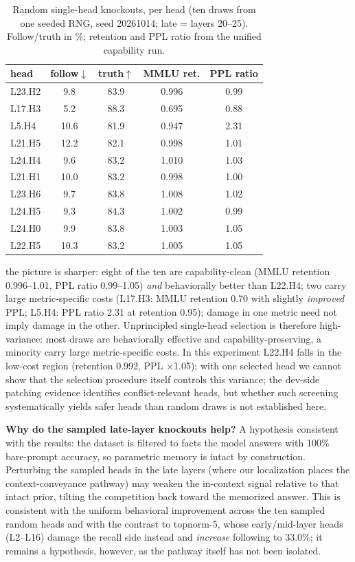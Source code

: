\documentclass[paper]{ieice}
\newcommand{\spec}{L22.H4}
\begin{document}
\begin{table}[t]
\caption{Random single-head knockouts, per head (ten draws from one
seeded RNG, seed 20261014; late = layers 20--25). Follow/truth in \%;
retention and PPL ratio from the unified capability run.}
\label{tab:rand1}
\begin{center}
\begin{tabular}{lcccc}
\toprule
head & follow$\downarrow$ & truth$\uparrow$ & MMLU ret. & PPL ratio \\
\midrule
L23.H2 & 9.8 & 83.9 & 0.996 & 0.99 \\
L17.H3 & 5.2 & 88.3 & 0.695 & 0.88 \\
L5.H4 & 10.6 & 81.9 & 0.947 & 2.31 \\
L21.H5 & 12.2 & 82.1 & 0.998 & 1.01 \\
L24.H4 & 9.6 & 83.2 & 1.010 & 1.03 \\
\midrule
L21.H1 & 10.0 & 83.2 & 0.998 & 1.00 \\
L23.H6 & 9.7 & 83.8 & 1.008 & 1.02 \\
L24.H5 & 9.3 & 84.3 & 1.002 & 0.99 \\
L24.H0 & 9.9 & 83.8 & 1.003 & 1.05 \\
L22.H5 & 10.3 & 83.2 & 1.005 & 1.05 \\
\bottomrule
\end{tabular}
\end{center}
\end{table}


the picture is sharper: eight of the ten are
capability-clean (MMLU retention 0.996--1.01, PPL ratio
0.99--1.05) \emph{and} behaviorally better than \spec{}; two carry large metric-specific costs (L17.H3: MMLU retention 0.70
with slightly \emph{improved} PPL; L5.H4: PPL ratio 2.31 at retention
0.95); damage in one metric need not imply damage in the other. Unprincipled single-head selection is therefore high-variance: most
draws are behaviorally effective and capability-preserving, a minority
carry large metric-specific costs. In this experiment \spec{} falls in
the low-cost region (retention 0.992, PPL $\times$1.05); with one
selected head we cannot show that the selection procedure itself
controls this variance; the dev-side patching evidence identifies
conflict-relevant heads, but whether such screening systematically
yields safer heads than random draws is not established here.

\textbf{Why do the sampled late-layer knockouts help?} A hypothesis
consistent with the results: the dataset is filtered to facts the
model answers with 100\% bare-prompt accuracy, so parametric memory
is intact by construction. Perturbing the sampled heads in the late
layers (where our localization places the context-conveyance pathway)
may weaken the in-context signal relative to that intact prior,
tilting the competition back toward the memorized answer. This is
consistent with the uniform behavioral improvement across the ten
sampled random heads and with the contrast to topnorm-5, whose
early/mid-layer heads (L2--L16) damage the recall side instead and
\emph{increase} following to 33.0\%; it remains a hypothesis,
however, as the pathway itself has not been isolated.
\end{document}
